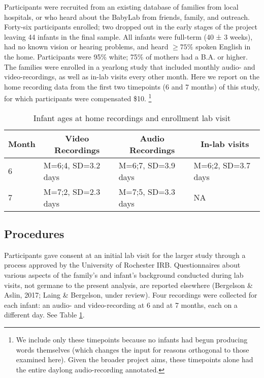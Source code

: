\documentclass[floatsintext,man]{apa6}
\theoremstyle{definition}
\theoremstyle{definition}
\theoremstyle{definition}
\theoremstyle{remark}
\begin{document}
Participants were recruited from an existing database of families from
local hospitals, or who heard about the BabyLab from friends, family,
and outreach. Forty-six participants enrolled; two dropped out in the
early stages of the project leaving 44 infants in the final sample. All
infants were full-term (40 ± 3 weeks), had no known vision or hearing
problems, and heard \(\geq 75\%\) spoken English in the home.
Participants were 95\% white; 75\% of mothers had a B.A. or higher. The
families were enrolled in a yearlong study that included monthly audio-
and video-recordings, as well as in-lab visits every other month. Here
we report on the home recording data from the first two timepoints (6
and 7 months) of this study, for which participants were compensated
\$10.
\footnote{We include only these timepoints because no infants had begun producing words themselves (which changes the input for reasons orthogonal to those examined here). Given the broader project aims, these timepoints alone had the entire daylong audio-recording annotated.}

\begin{table}[tbp]
\begin{center}
\begin{threeparttable}
\caption{\label{tab:recording-ages-table}Infant ages at home recordings and enrollment lab visit}
\begin{tabular}{llll}
\toprule
Month & \multicolumn{1}{c}{Video Recordings} & \multicolumn{1}{c}{Audio Recordings} & \multicolumn{1}{c}{In-lab visits}\\
\midrule
6 & M=6;4, SD=3.2 days & M=6;7, SD=3.9 days & M=6;2, SD=3.7 days\\
7 & M=7;2, SD=2.3 days & M=7;5, SD=3.3 days & NA\\
\bottomrule
\end{tabular}
\end{threeparttable}
\end{center}
\end{table}

\hypertarget{procedures}{%
\subsection{Procedures}\label{procedures}}

Participants gave consent at an initial lab visit for the larger study
through a process approved by the University of Rochester IRB.
Questionnaires about various aspects of the family's and infant's
background conducted during lab visits, not germane to the present
analysis, are reported elsewhere (Bergelson \& Aslin, 2017; Laing \&
Bergelson, under review). Four recordings were collected for each
infant: an audio- and video-recording at 6 and at 7 months, each on a
different day. See Table \ref{tab:recording-ages-table}.
\end{document}
